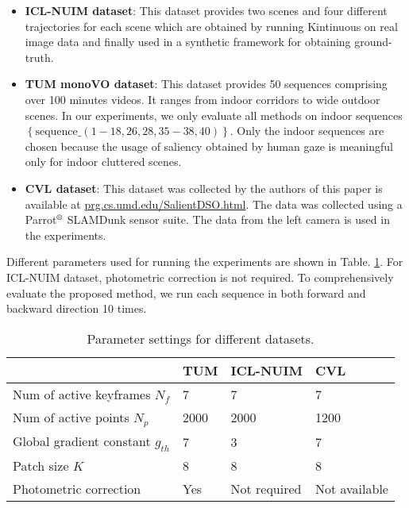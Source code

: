 \documentclass[letterpaper, 10 pt, conference]{ieeeconf}  %
\begin{document}
\begin{itemize}
    \item \textbf{ICL-NUIM dataset}\cite{ICL_NUIM}: This dataset provides two scenes and four different trajectories for each scene which are obtained by running Kintinuous on real image data and finally used in a synthetic framework for obtaining ground-truth.
    \item \textbf{TUM monoVO dataset}\cite{TUM}: This dataset provides 50 sequences comprising over 100 minutes videos. It ranges from indoor corridors to wide outdoor scenes. In our experiments, we only evaluate all methods on indoor sequences $\left\{\text{sequence\_}(1 - 18, 26, 28, 35 - 38, 40)\right\}$. Only the indoor sequences are chosen because the usage of saliency obtained by human gaze is meaningful only for indoor cluttered scenes.
    \item \textbf{CVL dataset}: This dataset was collected by the authors of this paper is available at \url{prg.cs.umd.edu/SalientDSO.html}. The data was collected using a Parrot$^\text{\textregistered}$ SLAMDunk \cite{SLAMDunk} sensor suite. The data from the left camera is used in the experiments.
\end{itemize}

Different parameters used for running the experiments are shown in Table. \ref{table:Parameters}. For ICL-NUIM dataset, photometric correction is not required. To comprehensively evaluate the proposed method, we run each sequence in both forward and backward direction 10 times.

\begin{table}[t!]
\centering
\caption{Parameter settings for different datasets.}
\label{table:Parameters}
\begin{tabular}{llll}
\hline
                                   & TUM  & ICL-NUIM & CVL     \\ \hline
Num of active keyframes $N_{f}$   & 7    & 7  & 7          \\
Num of active points $N_{p}$      & 2000 & 2000 & 1200         \\
Global gradient constant $g_{th}$ & 7    & 3  & 7          \\
Patch size $K$ & 8    & 8    & 8        \\
Photometric correction             & Yes  & Not required & Not available \\ \hline
\end{tabular}
\end{table}
\end{document}
